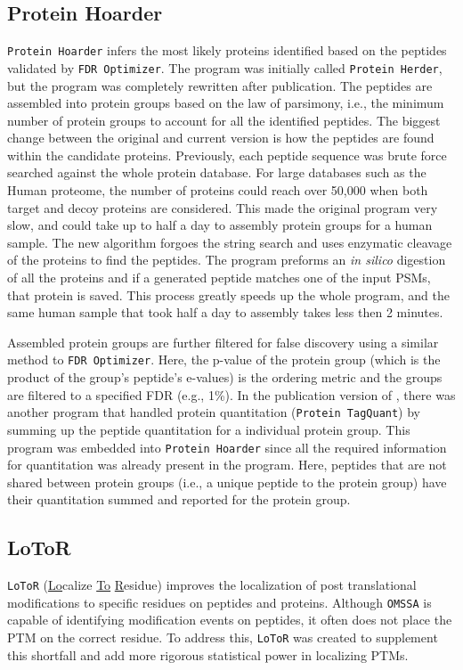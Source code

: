 \subsection*{Protein Hoarder}
\texttt{Protein Hoarder} infers the most likely proteins identified based on the peptides validated by \texttt{FDR Optimizer}. The program was initially called \texttt{Protein Herder}, but the program was completely rewritten after publication. 
The peptides are assembled into protein groups based on the law of parsimony, i.e., the minimum number of protein groups to account for all the identified peptides. The biggest change between the original and current version is how the peptides are found within the candidate proteins. Previously, each peptide sequence was brute force searched against the whole protein database. For large databases such as the Human proteome, the number of proteins could reach over 50,000 when both target and decoy proteins are considered. This made the original program very slow, and could take up to half a day to assembly protein groups for a human sample. The new algorithm forgoes the string search and uses enzymatic cleavage of the proteins to find the peptides. The program preforms an \emph{in silico} digestion of all the proteins and if a generated peptide matches one of the input PSMs, that protein is saved. This process greatly speeds up the whole program, and the same human sample that took half a day to assembly takes less then 2 minutes. 

Assembled protein groups are further filtered for false discovery using a similar method to \texttt{FDR Optimizer}. Here, the p-value of the protein group (which is the product of the group's peptide's e-values) is the ordering metric and the groups are filtered to a specified FDR (e.g., 1\%). In the publication version of \compass{}, there was another program that handled protein quantitation (\texttt{Protein TagQuant}) by summing up the peptide quantitation for a individual protein group. This program was embedded into \texttt{Protein Hoarder} since all the required information for quantitation was already present in the program. Here, peptides that are not shared between protein groups (i.e., a unique peptide to the protein group) have their quantitation summed and reported for the protein group.

\subsection*{LoToR}
\texttt{LoToR} (\underline{Lo}calize \underline{To} \underline{R}esidue) improves the localization of post translational modifications to specific residues on peptides and proteins. Although \texttt{OMSSA} is capable of identifying modification events on peptides, it often does not place the PTM on the correct residue. To address this, \texttt{LoToR} was created to supplement this shortfall and add more rigorous statistical power in localizing PTMs. 

